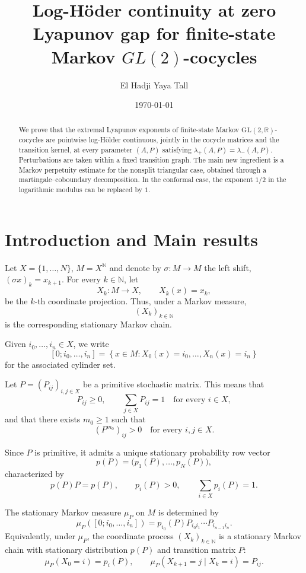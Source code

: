 \documentclass[11pt,a4paper]{amsart}
\title[Log-H\"older continuity]{Log-H\"oder continuity at zero Lyapunov gap for finite-state Markov $GL(2)$-cocycles}
\author{El Hadji Yaya Tall}
\date{\today}
\theoremstyle{definition}
\theoremstyle{remark}
\numberwithin{equation}{section}
\newcommand{\1}{\boldsymbol 1}
\def\NN{{\mathbb N}}
\begin{document}
\begin{abstract}
We prove that the extremal Lyapunov exponents of finite-state Markov $\mathrm{GL}(2,\mathbb R)$-cocycles are pointwise log-Hölder continuous, jointly in the cocycle matrices and the transition kernel, at every parameter $(A,P)$ satisfying $\lambda_+(A,P)=\lambda_-(A,P)$.
Perturbations are taken within a fixed transition graph. The main new ingredient is a Markov perpetuity estimate for the nonsplit triangular case, obtained through a martingale–coboundary decomposition. In the conformal case, the exponent $1/2$ in the logarithmic modulus can be replaced by $1$.
\end{abstract}
\maketitle
\tableofcontents

\section{Introduction and Main results}
\label{sec:intro}

Let $X=\{1,\ldots,N\}$, $M=X^{\NN}$ and denote by $\sigma:M\to M$ the left shift, $(\sigma x)_k=x_{k+1}$. For every \(k\in\NN\), let
$$
X_k:M\to X,
\qquad
X_k(x)=x_k,
$$
be the $k$-th coordinate projection. Thus, under a Markov measure,
$$(X_k)_{k\in\NN}$$ is the corresponding stationary Markov chain.

Given $i_0,\ldots,i_n\in X$, we write
$$
[0; i_0,\ldots,i_n]
=
\left\{
x\in M:
X_0(x)=i_0,\ldots,X_n(x)=i_n
\right\}
$$
for the associated cylinder set.

Let $P=(P_{ij})_{i,j\in X}$ be a primitive stochastic matrix. This
means that
$$
P_{ij}\geq 0,
\qquad
\sum_{j\in X}P_{ij}=1
\quad\text{for every }i\in X,
$$
and that there exists $m_0\geq 1$ such that
$$
(P^{m_0})_{ij}>0
\quad\text{for every }i,j\in X.
$$

Since $P$ is primitive, it admits a unique stationary probability
row vector
$$
p(P)=\bigl(p_1(P),\ldots,p_N(P)\bigr),
$$
characterized by
$$
p(P)P=p(P),
\qquad
p_i(P)>0,
\qquad
\sum_{i\in X}p_i(P)=1.
$$

The stationary Markov measure $\mu_P$ on $M$ is determined by
\begin{equation}\label{eq:stationary-markov-cylinder}
\mu_P([0; i_0,\ldots,i_n])
=
p_{i_0}(P)
P_{i_0i_1}\cdots P_{i_{n-1}i_n}.
\end{equation}
Equivalently, under $\mu_P$, the coordinate process
$(X_k)_{k\in\NN}$ is a stationary Markov chain with stationary
distribution $p(P)$ and transition matrix $P$:
$$
\mu_P(X_0=i)=p_i(P),
\qquad
\mu_P(X_{k+1}=j\mid X_k=i)=P_{ij}.
$$
\end{document}
